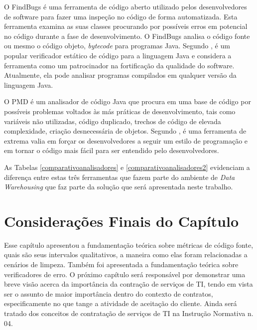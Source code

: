 O FindBugs é uma ferramenta de código aberto utilizado pelos desenvolvedores de software para fazer uma  inspeção no código de forma automatizada. Esta ferramenta examina as suas classes procurando por possíveis erros em potencial no código durante a fase de desenvolvimento. O FindBugs analisa o código fonte ou mesmo o código objeto, \textit{bytecode} para programas Java. Segundo , é um popular verificador estático de código para a linguagem Java e considera a ferramenta como um patrocinador na fortificação da qualidade do software. Atualmente, ela pode analisar programas compilados em qualquer versão da linguagem Java.


O PMD é um analisador de código Java que procura em uma base de código por possíveis problemas voltados às más práticas de desenvolvimento, tais como variáveis não utilizadas, código duplicado, trechos de código de elevada complexidade, criação desnecessária de objetos. Segundo \cite{Hovemeyer2004}, é uma ferramenta de extrema valia em forçar os desenvolvedores a seguir um estilo de programação e em tornar o código mais fácil para ser entendido pelo desenvolvedores.


As Tabelas \ref{comparativoanalisadores} e \ref{comparativoanalisadores2} evidenciam a diferença entre estas três ferramentas que fazem parte do ambiente de \textit{Data Warehousing} que faz parte da solução que será apresentada neste trabalho.
 
\begin{table}[H]

\end{table}
\FloatBarrier

\begin{table}[H]

\end{table}
\FloatBarrier


\section{Considerações Finais do Capítulo}  

Esse capítulo apresentou a fundamentação teórica sobre métricas de código fonte, quais são seus intervalos qualitativos, a maneira como elas foram relacionadas a cenários de limpeza. Também foi apresentada a fundamentação teórica sobre verificadores de erro. O próximo capítulo será responsável por demonstrar uma breve visão acerca da importância da contração de serviços de TI, tendo em vista ser o assunto de maior importância dentro do contexto de contratos, especificamente no que tange a atividade de aceitação do cliente. Ainda será tratado dos conceitos de contratação de serviços de TI na Instrução Normativa n. 04.
